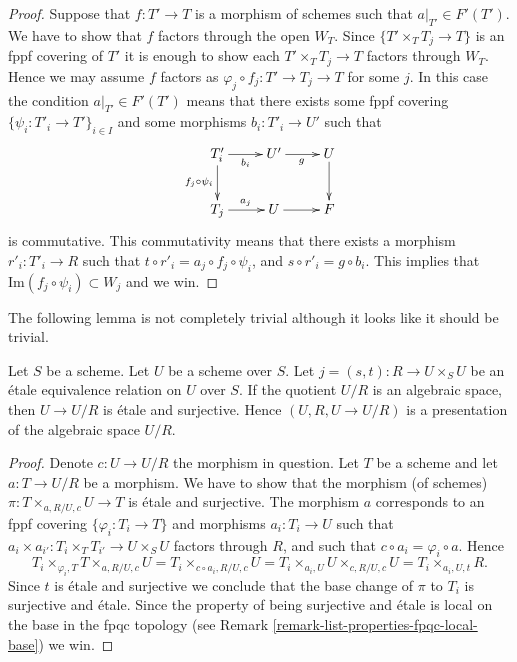 \begin{proof}
\medskip\noindent
Suppose that $f : T' \to T$ is a morphism of schemes
such that $a|_{T'} \in F'(T')$. We have to show that
$f$ factors through the open $W_T$. Since
$\{T' \times_T T_j \to T\}$ is an fppf covering of $T'$
it is enough to show each $T' \times_T T_j \to T$
factors through $W_T$. Hence we may assume $f$ factors
as $\varphi_j \circ f_j : T' \to T_j \to T$ for some $j$.
In this case the condition $a|_{T'} \in F'(T')$ means that there exists
some fppf covering $\{\psi_i : T'_i \to T'\}_{i \in I}$ and some
morphisms $b_i : T'_i \to U'$ such that
$$
\xymatrix{
T'_i \ar[r]_{b_i} \ar[d]_{f_j \circ \psi_i} & U' \ar[r]_g & U \ar[d] \\
T_j \ar[r]^{a_j} & U \ar[r] & F
}
$$
is commutative. This commutativity means that there exists a
morphism $r'_i : T'_i \to R$ such that
$t \circ r'_i = a_j \circ f_j \circ \psi_i$, and
$s \circ r'_i = g \circ b_i$. This implies that
$\text{Im}(f_j \circ \psi_i) \subset W_j$ and we win.
\end{proof}

\noindent
The following lemma is not completely trivial although it looks
like it should be trivial.

\begin{lemma}
\label{lemma-when-it-works-it-works}
Let $S$ be a scheme. Let $U$ be a scheme over $S$.
Let $j = (s, t) : R \to U \times_S U$
be an \'etale equivalence relation on $U$ over $S$.
If the quotient $U/R$ is an algebraic space, then
$U \to U/R$ is \'etale and surjective. Hence
$(U, R, U \to U/R)$ is a presentation of the algebraic
space $U/R$.
\end{lemma}

\begin{proof}
Denote $c : U \to U/R$ the morphism in question.
Let $T$ be a scheme and let $a : T \to U/R$ be a morphism.
We have to show that the morphism (of schemes)
$\pi : T \times_{a, R/U, c} U \to T$ is \'etale and surjective.
The morphism $a$ corresponds to an fppf covering
$\{\varphi_i : T_i \to T\}$ and morphisms $a_i : T_i \to U$ such
that
$a_i \times a_{i'} : T_i \times_T T_{i'} \to U \times_S U$
factors through $R$, and such that $c \circ a_i = \varphi_i \circ a$.
Hence
$$
T_i \times_{\varphi_i, T} T \times_{a, R/U, c} U =
T_i \times_{c \circ a_i, R/U, c} U =
T_i \times_{a_i, U} U \times_{c, R/U, c} U = T_i \times_{a_i, U, t} R.
$$
Since $t$ is \'etale and surjective we conclude that
the base change of $\pi$ to $T_i$ is surjective and \'etale.
Since the property of being surjective and \'etale is local
on the base in the fpqc topology (see
Remark \ref{remark-list-properties-fpqc-local-base})
we win.
\end{proof}

